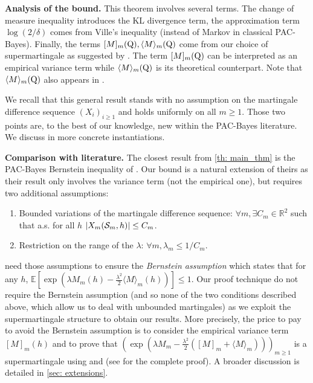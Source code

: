 \textbf{Analysis of the bound.} This theorem involves several terms. The change of measure inequality introduces the KL divergence term, the approximation term $\log(2/\delta)$ comes from Ville's inequality (instead of Markov in classical PAC-Bayes). Finally, the terms $[M]_m(\mathrm{Q}), \langle M\rangle_m(\mathrm{Q})$ come from our choice of supermartingale as suggested by \citet{bercu2008exponential}. The term $[M]_m(\mathrm{Q})$ can be interpreted as an empirical variance term while $\langle M\rangle_m(\mathrm{Q})$ is its theoretical counterpart. Note that $\langle M\rangle_m(\mathrm{Q})$ also appears in \citet[][Theorem 1]{seldin2012bandit}.

We recall that this general result stands with no assumption on the martingale difference sequence $(X_i)_{i\geq 1}$ and holds uniformly on all $m\geq 1$. Those two points are, to the best of our knowledge, new within the PAC-Bayes literature. We discuss
in  more concrete instantiations.

\textbf{Comparison with literature.} The closest result from \cref{th: main_thm} is the PAC-Bayes Bernstein inequality of \cite{seldin2012bandit}. Our bound is a natural extension of theirs as their result only involves the variance term (not the empirical one), but requires two additional assumptions:
\begin{enumerate}
  \item Bounded variations of the martingale difference sequence: $\forall m, \exists C_m\in\mathbb{R}^2$ such that a.s. for all $h$ $| X_m(\mathcal{S}_m,h)| \leq C_m$.
  \item Restriction on the range of the $\lambda$: $\forall m, \lambda_m \leq 1/C_m $.
\end{enumerate}
 \citet{seldin2012bandit} need those assumptions to ensure the \emph{Bernstein assumption} which states that for any $h$,
 $\mathbb{E}[\exp(\lambda M_m(h) - \frac{\lambda^2}{2} \langle M \rangle_m(h))] \leq 1$.
 Our proof technique do not require the Bernstein assumption (and so none of the two conditions described above, which allow us to deal with unbounded martingales) as we exploit the supermartingale structure to obtain our results. More precisely, the price to pay to avoid the Bernstein assumption is to consider the empirical variance term $[M]_m(h)$ and to prove that $\left( \exp \left(\lambda  M_{m}-\frac{\lambda^{2}}{2}\left([M]_{m}+\langle M\rangle_{m}\right)\right)  \right)_{m\geq 1} $
 is a supermartingale using  and  (see  for the complete proof).
 A broader discussion is detailed in \cref{sec: extensions}.

